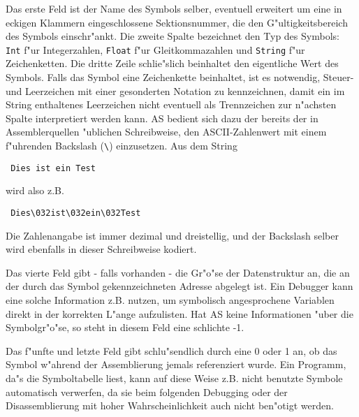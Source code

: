 \documentclass[12pt,a4paper,twoside]{report}
\newcommand{\tty}[1]{{\tt #1}}
\begin{document}
Das erste Feld ist der Name des Symbols selber, eventuell erweitert
um eine in eckigen Klammern eingeschlossene Sektionsnummer, die den
G"ultigkeitsbereich des Symbols einschr"ankt.  Die zweite Spalte
bezeichnet den Typ des Symbols: \tty{Int} f"ur Integerzahlen, \tty{Float} f"ur
Gleitkommazahlen und \tty{String} f"ur Zeichenketten.  Die dritte Zeile
schlie"slich beinhaltet den eigentliche Wert des Symbols.  Falls das
Symbol eine Zeichenkette beinhaltet, ist es notwendig, Steuer- und
Leerzeichen mit einer gesonderten Notation zu kennzeichnen, damit ein
im String enthaltenes Leerzeichen nicht eventuell als Trennzeichen
zur n"achsten Spalte interpretiert werden kann.  AS bedient sich dazu
der bereits der in Assemblerquellen "ublichen Schreibweise, den
ASCII-Zahlenwert mit einem f"uhrenden Backslash (\verb!\!) einzusetzen.  Aus
dem String
\begin{verbatim}
 Dies ist ein Test
\end{verbatim}
wird also z.B.
\begin{verbatim}
 Dies\032ist\032ein\032Test
\end{verbatim}
Die Zahlenangabe ist immer dezimal und dreistellig, und der Backslash
selber wird ebenfalls in dieser Schreibweise kodiert.

Das vierte Feld gibt - falls vorhanden - die Gr"o"se der Datenstruktur
an, die an der durch das Symbol gekennzeichneten Adresse abgelegt
ist.  Ein Debugger kann eine solche Information z.B. nutzen, um
symbolisch angesprochene Variablen direkt in der korrekten L"ange
aufzulisten.  Hat AS keine Informationen "uber die Symbolgr"o"se, so
steht in diesem Feld eine schlichte -1.

Das f"unfte und letzte Feld gibt schlu"sendlich durch eine 0 oder 1 an,
ob das Symbol w"ahrend der Assemblierung jemals referenziert wurde.
Ein Programm, da"s die Symboltabelle liest, kann auf diese Weise z.B.
nicht benutzte Symbole automatisch verwerfen, da sie beim folgenden
Debugging oder der Disassemblierung mit hoher Wahrscheinlichkeit auch
nicht ben"otigt werden.
\end{document}
